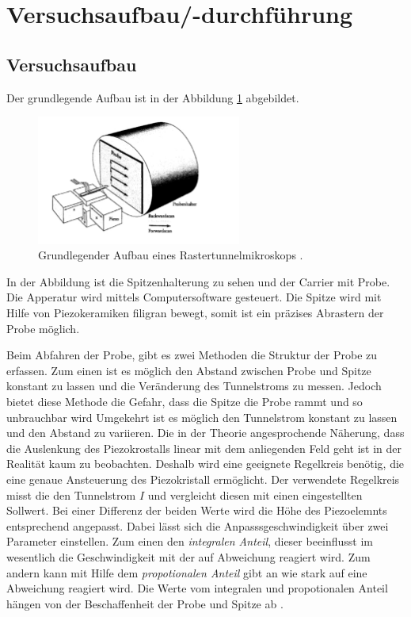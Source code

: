 \section{Versuchsaufbau/-durchführung}

\subsection{Versuchsaufbau}
Der grundlegende Aufbau ist in der Abbildung \ref{fig: aufbau} abgebildet.
\begin{figure}[h]
  \centering
  \includegraphics[width=0.6\textwidth]{./pics/aufbau.png}
  \caption{Grundlegender Aufbau eines Rastertunnelmikroskops \cite{anleitung_frankfurt}.}
  \label{fig: aufbau}
\end{figure}
In der Abbildung ist die Spitzenhalterung zu sehen und
der Carrier mit Probe. Die Apperatur wird mittels Computersoftware gesteuert.
Die Spitze wird mit Hilfe von Piezokeramiken filigran bewegt, somit
ist ein präzises Abrastern der Probe möglich.

Beim Abfahren der Probe, gibt es zwei Methoden die Struktur der Probe zu erfassen.
Zum einen ist es möglich den Abstand zwischen Probe und Spitze konstant zu lassen
und die Veränderung des Tunnelstroms zu messen.
Jedoch bietet diese Methode die Gefahr, dass die Spitze die Probe rammt und so unbrauchbar wird
Umgekehrt ist es möglich den Tunnelstrom konstant zu lassen und den Abstand zu variieren.
Die in der Theorie angesprochende Näherung, dass die Auslenkung des Piezokrostalls linear
mit dem anliegenden Feld geht ist in der Realität kaum zu beobachten. Deshalb wird eine
geeignete Regelkreis benötig, die eine genaue Ansteuerung des Piezokristall ermöglicht.
Der verwendete Regelkreis misst die den Tunnelstrom $I$ und vergleicht diesen mit einen
eingestellten Sollwert. Bei einer Differenz der beiden Werte wird die Höhe des Piezoelemnts
entsprechend angepasst. Dabei lässt sich die Anpasssgeschwindigkeit über zwei Parameter
einstellen. Zum einen den \emph{integralen Anteil}, dieser beeinflusst im wesentlich die
Geschwindigkeit mit der auf Abweichung reagiert wird. Zum andern kann mit Hilfe
dem \emph{propotionalen Anteil} gibt an wie stark auf eine Abweichung reagiert wird.
Die Werte vom integralen und propotionalen Anteil hängen von der Beschaffenheit
der Probe und Spitze ab \cite{anleitung_frankfurt}.

